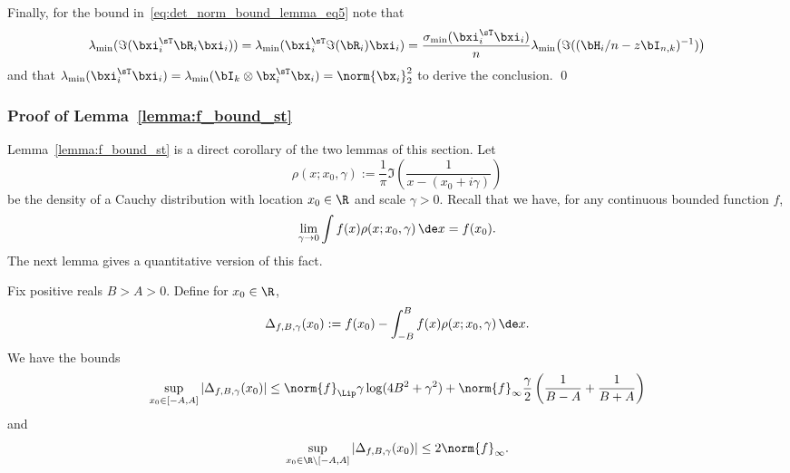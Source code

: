 Finally, for the bound in~\eqref{eq:det_norm_bound_lemma_eq5} note that
\begin{equation}
    \lambda_{\min}(\Im(\bxi_i^\sT\bR_i \bxi_i)) = 
    \lambda_{\min}(\bxi_i^\sT\Im(\bR_i) \bxi_i) = \frac{\sigma_{\min}(\bxi_i^\sT\bxi_i)}{n} \lambda_{\min}
    \big(\Im( (\bH_i/n - z\bI_{n,k})^{-1})\big)
\end{equation}
and that  $\lambda_{\min}(\bxi_i^\sT\bxi_i) = \lambda_{\min}(\bI_k \otimes \bx_i^\sT\bx_i)= \norm{\bx_i}_2^2$ to derive the conclusion.
\qed



\subsubsection{Proof of Lemma~\ref{lemma:f_bound_st}}
\label{sec:proof_lemma_f_bound_st}
Lemma~\ref{lemma:f_bound_st} is a direct corollary of the two lemmas of this section.
Let
\begin{equation}
    \rho(x; x_0, \gamma) := \frac1\pi \Im\left( \frac{1}{x - (x_0 + i\gamma)} \right)
\end{equation}
be the density of a Cauchy distribution with location $x_0\in\R$ and scale $\gamma>0$. Recall that we have, for any continuous bounded function $f$,
$$\lim_{\gamma \to 0}\int f(x) \rho(x; x_0, \gamma) \, \de x = f(x_0).$$
The next lemma gives a quantitative version of this
fact.

\begin{lemma}
\label{lemma:quant_dirac_integral}
Fix positive reals $B > A > 0$. Define for $x_0 \in\R$,
\begin{equation}
    \Delta_{f,B,\gamma}(x_0):= f(x_0) - \int_{-B}^B  f(x)\rho(x;x_0,\gamma)\, \de x.
\end{equation}
We have the bounds
\begin{equation}
\nonumber
        \sup_{x_0 \in [-A,A]}\left|\Delta_{ f,B,\gamma}(x_0)\right|\leq \norm{f}_{\Lip} \gamma\log(4B^2+\gamma^2)
        +\norm{f}_\infty \frac{\gamma}{2} \left(\frac1{B-A} + \frac1{B+A}\right)
\end{equation}
and
\begin{equation}
\nonumber
    \sup_{x_0 \in \R \setminus [-A,A]}\left|\Delta_{ f,B,\gamma}(x_0)\right|
    \leq 
    2\norm{f}_\infty.
\end{equation}
\end{lemma}



